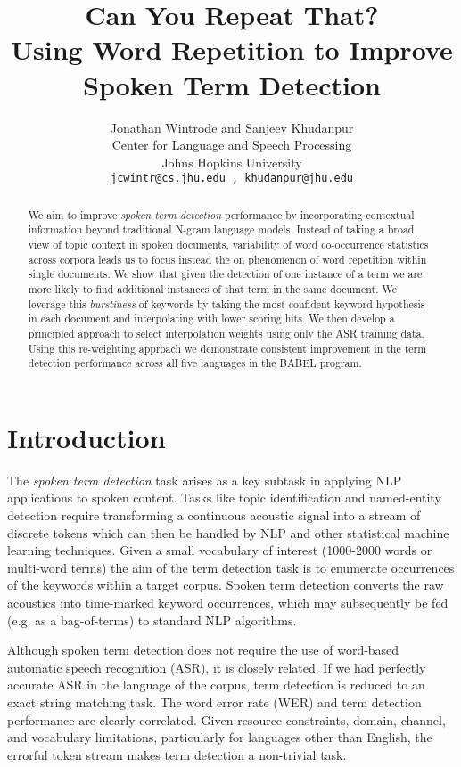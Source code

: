 \documentclass[11pt]{article}
\title{Can You Repeat That? \\ Using Word Repetition to Improve Spoken Term Detection}
\author{Jonathan Wintrode \textnormal {and} Sanjeev Khudanpur\\
  Center for Language and Speech Processing \\
  Johns Hopkins University\\
  {\tt jcwintr@cs.jhu.edu , khudanpur@jhu.edu} }
\date{}
\begin{document}
\maketitle
\begin{abstract}
We aim to improve \emph{spoken term detection} performance by incorporating contextual information beyond traditional N-gram language models.  Instead of taking a broad view of topic context in spoken documents, variability of word co-occurrence statistics across corpora leads us to focus instead the on phenomenon of word repetition within single documents.  We show that given the detection of one instance of a term we are more likely to find additional instances of that term in the same document.  We leverage this \emph{burstiness} of keywords by taking the most confident keyword hypothesis in each document and interpolating with lower scoring hits.  We then develop a principled approach to select interpolation weights using only the ASR training data.  Using this re-weighting approach we demonstrate consistent improvement in the term detection performance across all five languages in the {\small BABEL} program.
\end{abstract}


\section{Introduction}

The {\em spoken term detection} task arises as a key subtask in applying NLP applications to spoken content.  Tasks like topic identification and named-entity detection require transforming a continuous acoustic signal into a stream of discrete tokens which can then be handled by NLP and other statistical machine learning techniques.  Given a small vocabulary of interest (1000-2000 words or multi-word terms) the aim of the term detection task is to enumerate occurrences of the keywords within a target corpus.  Spoken term detection converts the raw acoustics into time-marked keyword occurrences, which may subsequently be fed (e.g. as a bag-of-terms) to standard NLP algorithms. 

Although spoken term detection does not require the use of word-based automatic speech recognition (ASR), it is closely related.   If we had perfectly accurate ASR in the language of the corpus, term detection is reduced to an exact string matching task.  The word error rate (WER) and term detection performance are clearly correlated.  Given resource constraints, domain, channel, and vocabulary limitations, particularly for languages other than English, the errorful token stream makes term detection a non-trivial task.
\end{document}
